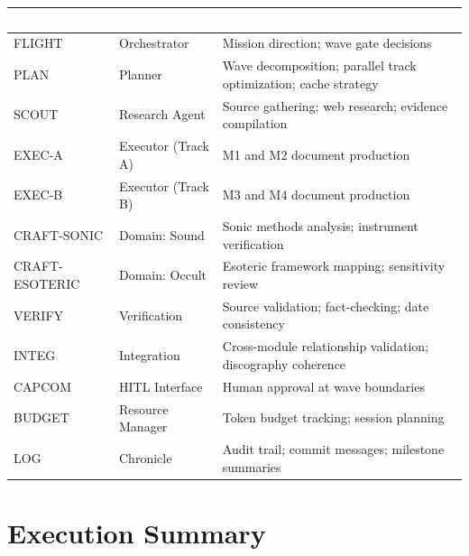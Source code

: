\documentclass[11pt,letterpaper]{article}
\newcommand{\tableheader}[1]{\textbf{\sffamily\textcolor{white}{#1}}}
\begin{document}
\begin{center}
\begin{tabularx}{\textwidth}{L{2cm}L{2.5cm}X}
\toprule
{}
\tableheader{Role} & \tableheader{Agent} & \tableheader{Responsibility} \\
\midrule
FLIGHT & Orchestrator & Mission direction; wave gate decisions \\
PLAN & Planner & Wave decomposition; parallel track optimization; cache strategy \\
SCOUT & Research Agent & Source gathering; web research; evidence compilation \\
EXEC-A & Executor (Track A) & M1 and M2 document production \\
EXEC-B & Executor (Track B) & M3 and M4 document production \\
CRAFT-SONIC & Domain: Sound & Sonic methods analysis; instrument verification \\
CRAFT-ESOTERIC & Domain: Occult & Esoteric framework mapping; sensitivity review \\
VERIFY & Verification & Source validation; fact-checking; date consistency \\
INTEG & Integration & Cross-module relationship validation; discography coherence \\
CAPCOM & HITL Interface & Human approval at wave boundaries \\
BUDGET & Resource Manager & Token budget tracking; session planning \\
LOG & Chronicle & Audit trail; commit messages; milestone summaries \\
\bottomrule
\end{tabularx}
\end{center}

\section{Execution Summary}
\end{document}
